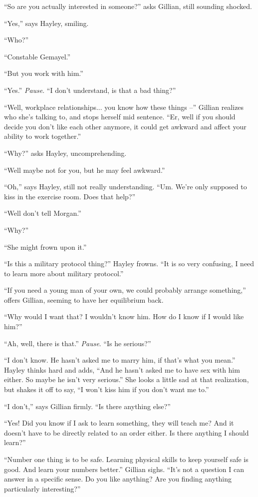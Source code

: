 ``So are you actually interested in someone?'' asks Gillian, still sounding shocked.

``Yes,'' says Hayley, smiling.

``Who?''

``Constable Gemayel.''

``But you work with him.''

``Yes.''  \textit{Pause}.  ``I don't understand, is that a bad thing?''

``Well, workplace relationships... you know how these things --'' Gillian realizes who she's talking to, and stops herself mid sentence.  ``Er, well if you should decide you don't like each other anymore, it could get awkward and affect your ability to work together.''

``Why?'' asks Hayley, uncomprehending.

``Well maybe not for you, but he may feel awkward.''

``Oh,'' says Hayley, still not really understanding.  ``Um.  We're only supposed to kiss in the exercise room.  Does that help?''

``Well don't tell Morgan.''

``Why?''

``She might frown upon it.''

``Is this a military protocol thing?''  Hayley frowns.  ``It is so very confusing, I need to learn more about military protocol.''

``If you need a young man of your own, we could probably arrange something,'' offers Gillian, seeming to have her equilibrium back.

``Why would I want that?  I wouldn't know him.  How do I know if I would like him?''

``Ah, well, there is that.'' \textit{Pause}.  ``Is he serious?''

``I don't know.  He hasn't asked me to marry him, if that's what you mean.''  Hayley thinks hard and adds, ``And he hasn't asked me to have sex with him either.  So maybe he isn't very serious.''  She looks a little sad at that realization, but shakes it off to say,  ``I won't kiss him if you don't want me to.''

``I don't,'' says Gillian firmly.  ``Is there anything else?''

``Yes!  Did you know if I ask to learn something, they will teach me?  And it doesn't have to be directly related to an order either.  Is there anything I should learn?''

``Number one thing is to be safe.  Learning physical skills to keep yourself safe is good.  And learn your numbers better.''  Gillian sighs.  ``It's not a question I can answer in a specific sense.  Do you like anything?  Are you finding anything particularly interesting?''


